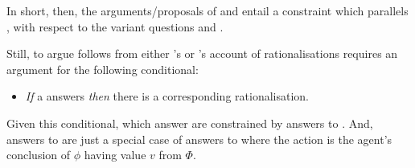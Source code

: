 \begin{note}
  In short, then, the arguments/proposals of \citeauthor{Davidson:1963aa} and \citeauthor{Hieronymi:2011aa} entail a constraint which parallels \issueInclusion{}, with respect to the variant questions \qWhyR{} and \qHowR{}.

  Still, to argue \issueInclusion{} follows from either \citeauthor{Davidson:1963aa}'s or \citeauthor{Hieronymi:2011aa}'s account of rationalisations requires an argument for the following conditional:
  \begin{itemize}
  \item
    \emph{If} a \ros{} answers \qWhy{} \emph{then} there is a corresponding rationalisation.
  \end{itemize}
  Given this conditional, \ros{} which answer \qWhy{} are constrained by answers to \qHowR{}.
  And, answers to \qHow{} are just a special case of answers to \qHowR{} where the action is the agent's conclusion of \(\phi\) having value \(v\) from \(\Phi\).
\end{note}

